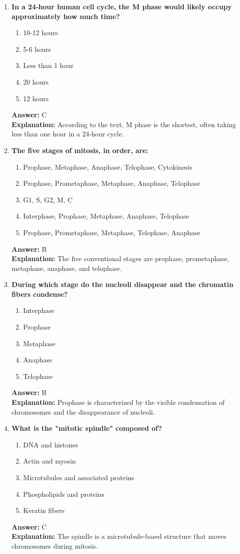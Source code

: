 \documentclass[11pt, a4paper]{article}
\begin{document}
\begin{enumerate}[leftmargin=*, label=\arabic*.]
\item \textbf{In a 24-hour human cell cycle, the M phase would likely occupy approximately how much time?}
\begin{enumerate}[label=\Alph*.]
\item 10-12 hours
\item 5-6 hours
\item Less than 1 hour
\item 20 hours
\item 12 hours
\end{enumerate}
\textbf{Answer:} C \\
\textbf{Explanation:} According to the text, M phase is the shortest, often taking less than one hour in a 24-hour cycle.

\item \textbf{The five stages of mitosis, in order, are:}
\begin{enumerate}[label=\Alph*.]
\item Prophase, Metaphase, Anaphase, Telophase, Cytokinesis
\item Prophase, Prometaphase, Metaphase, Anaphase, Telophase
\item G1, S, G2, M, C
\item Interphase, Prophase, Metaphase, Anaphase, Telophase
\item Prophase, Prometaphase, Metaphase, Telophase, Anaphase
\end{enumerate}
\textbf{Answer:} B \\
\textbf{Explanation:} The five conventional stages are prophase, prometaphase, metaphase, anaphase, and telophase.

\item \textbf{During which stage do the nucleoli disappear and the chromatin fibers condense?}
\begin{enumerate}[label=\Alph*.]
\item Interphase
\item Prophase
\item Metaphase
\item Anaphase
\item Telophase
\end{enumerate}
\textbf{Answer:} B \\
\textbf{Explanation:} Prophase is characterized by the visible condensation of chromosomes and the disappearance of nucleoli.

\item \textbf{What is the "mitotic spindle" composed of?}
\begin{enumerate}[label=\Alph*.]
\item DNA and histones
\item Actin and myosin
\item Microtubules and associated proteins
\item Phospholipids and proteins
\item Keratin fibers
\end{enumerate}
\textbf{Answer:} C \\
\textbf{Explanation:} The spindle is a microtubule-based structure that moves chromosomes during mitosis.


\end{enumerate}
\end{document}
